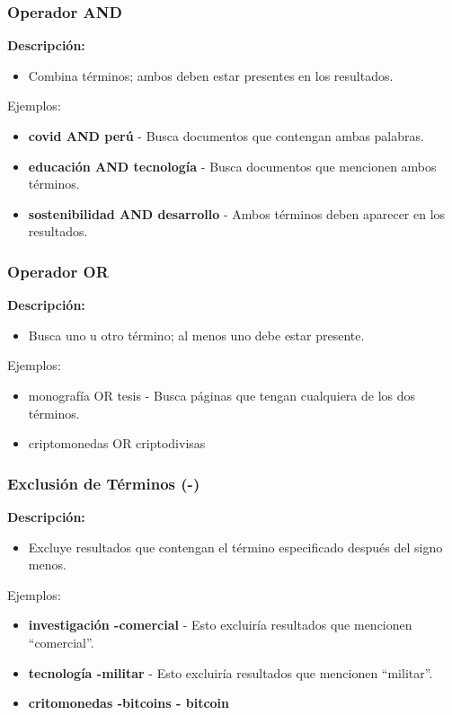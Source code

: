 \documentclass[
11pt, %
]{beamer}
\begin{document}
\begin{frame}
	\frametitle{Operador AND}
	\textbf{Descripción:}
	\begin{itemize}
		\item Combina términos; ambos deben estar presentes en los resultados.
	\end{itemize}
	\begin{exampleblock}{Ejemplos:}
		\begin{itemize}
			\item \textbf{covid AND perú} - Busca documentos que contengan ambas palabras.
			\item \textbf{educación AND tecnología} - Busca documentos que mencionen ambos términos.
			\item \textbf{sostenibilidad AND desarrollo} - Ambos términos deben aparecer en los resultados.
		\end{itemize}
	\end{exampleblock}
\end{frame}

\begin{frame}
	\frametitle{Operador OR}
	\textbf{Descripción:}
	\begin{itemize}
		\item Busca uno u otro término; al menos uno debe estar presente.
	\end{itemize}
	\begin{exampleblock}{Ejemplos:}
		\begin{itemize}
			\item monografía OR tesis - Busca páginas que tengan cualquiera de los dos términos.
			\item criptomonedas OR criptodivisas
		\end{itemize}
	\end{exampleblock}

\end{frame}

\begin{frame}
	\frametitle{Exclusión de Términos (-)}
	\textbf{Descripción:}
	\begin{itemize}
		\item Excluye resultados que contengan el término especificado después del signo
		      menos.
	\end{itemize}

	\begin{exampleblock}{Ejemplos:}
		\begin{itemize}
			\item \textbf{investigación -comercial} - Esto excluiría resultados que mencionen ``comercial''.
			\item \textbf{tecnología -militar} - Esto excluiría resultados que mencionen ``militar''.
			\item \textbf{critomonedas -bitcoins - bitcoin}
		\end{itemize}
	\end{exampleblock}

\end{frame}
\end{document}

